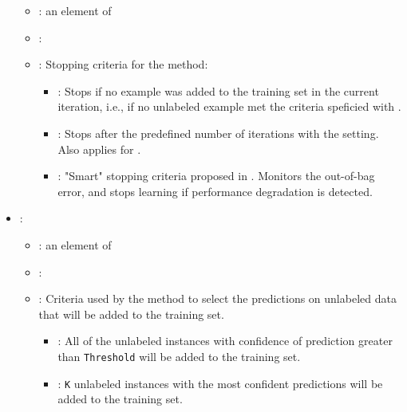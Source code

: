\begin{itemize}
\begin{itemize}
                \item \optionPossibleValues{}: an element of 
                \item \optionDefaultValue{}: 
                \item \optionDescrption{}:  Stopping criteria for the  method:
                \begin{itemize}
                    \item {}: Stops if no example was added to the training set in the current iteration, i.e., if no unlabeled example met the criteria speficied with . 
                    \item {}: Stops after the predefined number of iterations with the  setting. Also applies for .
                    \item {}: "Smart" stopping criteria proposed in \cite{leistner2009semi}. Monitors the out-of-bag error, and stops learning if performance degradation is detected. 
                \end{itemize}
           \end{itemize}
    \item {}:
           \begin{itemize}
                \item \optionPossibleValues{}: an element of 
                \item \optionDefaultValue{}: 
                \item \optionDescrption{}: Criteria used by the  method to select the predictions on unlabeled data that will be added to the training set.
                \begin{itemize}
                    \item {}: All of the unlabeled instances with confidence of prediction greater than {\tt Threshold} will be added to the training set.
                    \item {}: {\tt K} unlabeled instances with the most confident predictions will be added to the training set.

\end{itemize}
\end{itemize}
\end{itemize}

